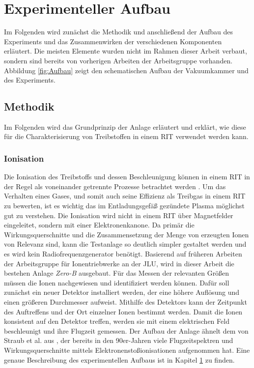 \chapter{Experimenteller Aufbau}
\label{chap:Aufbau}
Im Folgenden wird zunächst die Methodik und anschließend der Aufbau des Experiments und das Zusammenwirken der verschiedenen Komponenten erläutert. Die meisten Elemente wurden nicht im Rahmen dieser Arbeit verbaut, sondern sind bereits von vorherigen Arbeiten der Arbeitsgruppe vorhanden. Abbildung \ref{fig:Aufbau} zeigt den schematischen Aufbau der Vakuumkammer und des Experiments.

\section{Methodik}
Im Folgenden wird das Grundprinzip der Anlage erläutert und erklärt, wie diese für die Charakterisierung von Treibstoffen in einem RIT verwendet werden kann.

\subsection{Ionisation} 
Die Ionisation des Treibstoffs und dessen Beschleunigung können in einem RIT in der Regel als voneinander getrennte Prozesse betrachtet werden \cite{ion}. Um das Verhalten eines Gases, und somit auch seine Effizienz als Treibgas in einem RIT zu bewerten, ist es wichtig das im Entladungsgefäß gezündete Plasma möglichst gut zu verstehen. Die Ionisation wird nicht in einem RIT über Magnetfelder eingeleitet, sondern mit einer Elektronenkanone. Da primär die Wirkungsquerschnitte und die Zusammensetzung der Menge von erzeugten Ionen von Relevanz sind, kann die Testanlage so deutlich simpler gestaltet werden und es wird kein Radiofrequenzgenerator benötigt. Basierend auf früheren Arbeiten der Arbeitsgruppe für Ionentriebwerke an der JLU, wird in dieser Arbeit die bestehen Anlage \textit{Zero-B} ausgebaut. Für das Messen der relevanten Größen müssen die Ionen nachgewiesen und identifiziert werden können. Dafür soll zunächst ein neuer Detektor installiert werden, der eine höhere Auflösung und einen größeren Durchmesser aufweist. Mithilfe des Detektors kann der Zeitpunkt des Auftreffens und der Ort einzelner Ionen bestimmt werden. Damit die Ionen konsistent auf den Detektor treffen, werden sie mit einem elektrischen Feld beschleunigt und ihre Flugzeit gemessen. Der Aufbau der Anlage ähnelt dem von Straub et al. aus \cite{Straub}, der bereits in den 90er-Jahren viele Flugzeitspektren und Wirkungsquerschnitte mittels Elektronenstoßionisationen aufgenommen hat. Eine genaue Beschreibung des experimentellen Aufbaus ist in Kapitel \ref{chap:Aufbau} zu finden.

